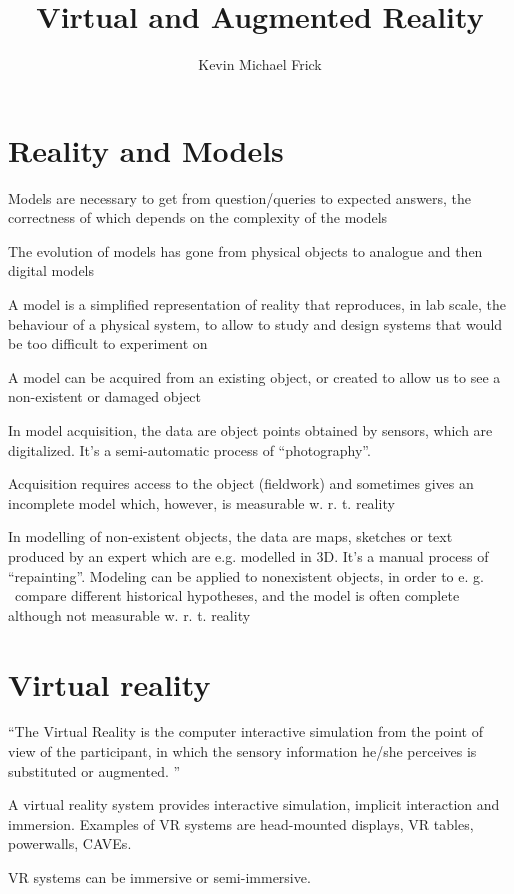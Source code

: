 \documentclass[a4paper]{article}
\title{Virtual and Augmented Reality}
\author{Kevin Michael Frick}
\begin{document}
\maketitle

\section{Reality and Models}

Models are necessary to get from question/queries to expected answers,
the correctness of which depends on the complexity of the models

The evolution of models has gone from physical objects to analogue and
then digital models

A model is a simplified representation of reality that reproduces, in
lab scale, the behaviour of a physical system, to allow to study
and design systems that would be too difficult to experiment on

A model can be acquired from an existing object, or created to
allow us to see a non-existent or damaged object

In model acquisition, the data are object points obtained by sensors,
which are digitalized.
It's a semi-automatic process of ``photography''.

Acquisition requires access to the object (fieldwork) and sometimes
gives an incomplete model which, however, is measurable w.
r.
t.
reality

In modelling of non-existent objects, the data are maps, sketches or text
produced by an expert which are e.g. modelled in 3D.
It's a manual
process of ``repainting''.
Modeling can be applied to nonexistent
objects, in order to e.
g.
~compare different historical hypotheses, and
the model is often complete although not measurable w.
r.
t.
reality

\section{Virtual reality}

``The Virtual Reality is the computer interactive simulation from the
point of view of the participant, in which the sensory information
he/she perceives is substituted or augmented.
''

A virtual reality system provides interactive simulation, implicit
interaction and immersion.
Examples of VR systems are head-mounted
displays, VR tables, powerwalls, CAVEs.

VR systems can be immersive or semi-immersive.
\end{document}
